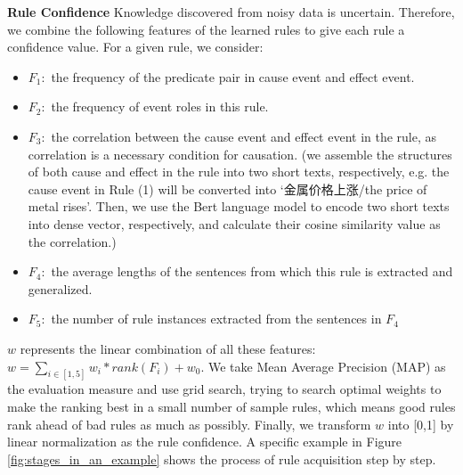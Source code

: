 \textbf{Rule Confidence}
Knowledge discovered from noisy data is uncertain. Therefore, we combine the following features of the learned rules to give each rule a confidence value. For a given rule, we consider:
\begin{itemize}
\item $F_1:$ the frequency of the predicate pair in cause event and effect event.
\item $F_2:$ the frequency of event roles in this rule.
\item $F_3:$ the correlation between the cause event and effect event in the rule, as correlation is a necessary condition for causation. (we assemble the structures of both cause and effect in the rule into two short texts, respectively, e.g. the cause event in Rule (1) will be converted into `金属价格上涨/the price of metal rises'. Then, we use the Bert language model \cite{devlin2018bert} to encode two short texts into dense vector, respectively, and calculate their cosine similarity value as the correlation.)
\item $F_4:$ the average lengths of the sentences from which this rule is extracted and generalized.
\item $F_5:$ the number of rule instances extracted from the sentences in $F_4$
\end{itemize}

$w$ represents the linear combination of all these features: $w=\sum_{i\in[1,5]}w_i*rank(F_i)+w_0$. We take Mean Average Precision (MAP) \cite{baeza1999modern,cao2007learning} as the evaluation measure and use grid search, trying to search optimal weights to make the ranking best in a small number of sample rules, which means good rules rank ahead of bad rules as much as possibly.
Finally, we transform $w$ into [0,1] by linear normalization as the rule confidence. A specific example in Figure \ref{fig:stages_in_an_example} shows the process of rule acquisition step by step.

